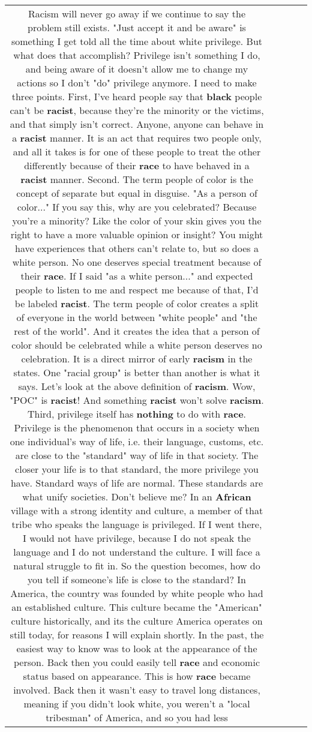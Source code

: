 \documentclass[11pt]{article}
\newlength\mylength
\begin{document}
\begin{center}
\begin{longtable}{|C{.65\mylength}|C{.30\mylength}|C{.12\mylength}|C{.12\mylength}|C{.12\mylength}|}
  \small Racism will never go away if we continue to say the problem still exists. "Just accept it and be aware" is something I get told all the time about white privilege. But what does that accomplish? Privilege isn't something I do, and being aware of it doesn't allow me to change my actions so I don't "do" privilege anymore. I need to make three points. First, I've heard people say that \textbf{black} people can't be \textbf{racist}, because they're the minority or the victims, and that simply isn't correct. Anyone, anyone can behave in a \textbf{racist} manner. It is an act that requires two people only, and all it takes is for one of these people to treat the other differently because of their \textbf{race} to have behaved in a \textbf{racist} manner. Second. The term people of color is the concept of separate but equal in disguise. "As a person of color..." If you say this, why are you celebrated? Because you're a minority? Like the color of your skin gives you the right to have a more valuable opinion or insight? You might have experiences that others can't relate to, but so does a white person. No one deserves special treatment because of their \textbf{race}. If I said "as a white person..." and expected people to listen to me and respect me because of that, I'd be labeled \textbf{racist}. The term people of color creates a split of everyone in the world between "white people" and "the rest of the world". And it creates the idea that a person of color should be celebrated while a white person deserves no celebration. It is a direct mirror of early \textbf{racism} in the states. One "racial group" is better than another is what it says. Let's look at the above definition of \textbf{racism}. Wow, "POC" is \textbf{racist}! And something \textbf{racist} won't solve \textbf{racism}. Third, privilege itself has \textbf{nothing} to do with \textbf{race}. Privilege is the phenomenon that occurs in a society when one individual's way of life, i.e. their language, customs, etc. are close to the "standard" way of life in that society. The closer your life is to that standard, the more privilege you have. Standard ways of life are normal. These standards are what unify societies. Don't believe me? In an \textbf{African} village with a strong identity and culture, a member of that tribe who speaks the language is privileged. If I went there, I would not have privilege, because I do not speak the language and I do not understand the culture. I will face a natural struggle to fit in. So the question becomes, how do you tell if someone's life is close to the standard? In America, the country was founded by white people who had an established culture. This culture became the "American" culture historically, and its the culture America operates on still today, for reasons I will explain shortly. In the past, the easiest way to know was to look at the appearance of the person. Back then you could easily tell \textbf{race} and economic status based on appearance. This is how \textbf{race} became involved. Back then it wasn't easy to travel long distances, meaning if you didn't look white, you weren't a "local tribesman" of America, and so you had less 
\end{longtable}
\end{center}
\end{document}
